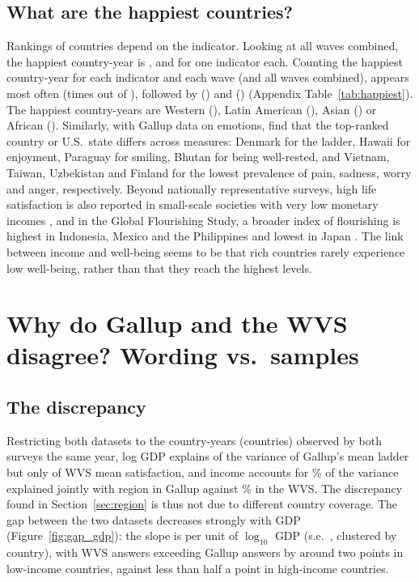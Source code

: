\documentclass[12pt]{article}
\begin{document}
\subsection{What are the happiest countries?}\label{subsec:happiest}
Rankings of countries depend on the indicator. Looking at all waves combined, the happiest country-year is \happiestAllWavesTop, and \happiestAllWavesOthers for one indicator each. Counting the happiest country-year for each indicator and each wave (and all waves combined), \happiestFirst appears most often (\happiestFirstN times out of \nHappiestCells), followed by \happiestSecond (\happiestSecondN) and \happiestThird (\happiestThirdN) (Appendix Table~\ref{tab:happiest}). The happiest country-years are Western (\happiestRegionWestern), Latin American (\happiestRegionLatinAmerica), Asian (\happiestRegionAsia) or African (\happiestRegionAfrica). Similarly, with Gallup data on emotions, \citet{blanchflower_wellbeing_2024} find that the top-ranked country or U.S.\ state differs across measures: Denmark for the ladder, Hawaii for enjoyment, Paraguay for smiling, Bhutan for being well-rested, and Vietnam, Taiwan, Uzbekistan and Finland for the lowest prevalence of pain, sadness, worry and anger, respectively. Beyond nationally representative surveys, high life satisfaction is also reported in small-scale societies with very low monetary incomes \citep{galbraith_high_2024}, and in the Global Flourishing Study, a broader index of flourishing is highest in Indonesia, Mexico and the Philippines and lowest in Japan \citep{vanderweele_global_2025}. The link between income and well-being seems to be that rich countries rarely experience low well-being, rather than that they reach the highest levels.


\section{Why do Gallup and the WVS disagree? Wording vs.\ samples}\label{sec:discrepancy}
\subsection{The discrepancy}\label{subsec:global_gap}

Restricting both datasets to the \nCommon country-years (\nCommonCountries countries) observed by both surveys the same year, log GDP explains \RtwoCommonGallup of the variance of Gallup's mean ladder but only \RtwoCommonWVS of WVS mean satisfaction, and income accounts for \shareIncomeCommonGallup\% of the variance explained jointly with region in Gallup against \shareIncomeCommonWVS\% in the WVS. The discrepancy found in Section~\ref{sec:region} is thus not due to different country coverage. The gap between the two datasets decreases strongly with GDP (Figure~\ref{fig:gap_gdp}): the slope is \slopeGapGDP per unit of $\log_{10}$ GDP (s.e.\ \seSlopeGapGDP, clustered by country), with WVS answers exceeding Gallup answers by around two points in low-income countries, against less than half a point in high-income countries.
\end{document}
